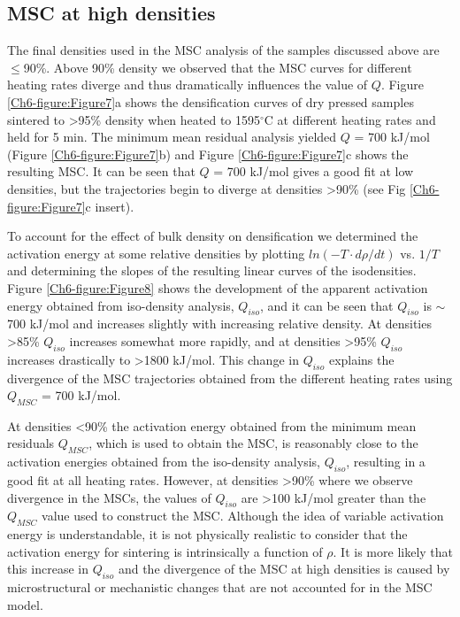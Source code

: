 \subsection{MSC at high densities}
The final densities used in the MSC analysis of the samples discussed above are $\leq$90\%. Above 90\% density we observed that the MSC curves for different heating rates diverge and thus dramatically influences the value of $Q$. Figure \ref{Ch6-figure:Figure7}a shows the densification curves of dry pressed samples sintered to >95\% density when heated to 1595$^{\circ}$C at different heating rates and held for 5 min. The minimum mean residual analysis yielded $Q$ = 700 kJ/mol (Figure \ref{Ch6-figure:Figure7}b) and Figure \ref{Ch6-figure:Figure7}c shows the resulting MSC. It can be seen that $Q$ = 700 kJ/mol gives a good fit at low densities, but the trajectories begin to diverge at densities >90\% (see Fig \ref{Ch6-figure:Figure7}c insert). 

To account for the effect of bulk density on densification we determined the activation energy at some relative densities by plotting $ln(-T \cdot d\rho/dt)$ vs. $1/T$ and determining the slopes of the resulting linear curves of the isodensities. Figure \ref{Ch6-figure:Figure8} shows the development of the apparent activation energy obtained from iso-density analysis, $Q_{iso}$, and it can be seen that $Q_{iso}$ is $\sim$700 kJ/mol and increases slightly with increasing relative density. At densities >85\% $Q_{iso}$ increases somewhat more rapidly, and at densities >95\% $Q_{iso}$ increases drastically to >1800 kJ/mol. This change in $Q_{iso}$ explains the divergence of the MSC trajectories obtained from the different heating rates using $Q_{MSC}$ = 700 kJ/mol. 

At densities <90\% the activation energy obtained from the minimum mean residuals $Q_{MSC}$, which is used to obtain the MSC, is reasonably close to the activation energies obtained from the iso-density analysis, $Q_{iso}$, resulting in a good fit at all heating rates. However, at densities >90\% where we observe divergence in the MSCs, the values of $Q_{iso}$ are >100 kJ/mol greater than the $Q_{MSC}$ value used to construct the MSC. Although the idea of variable activation energy is understandable, it is not physically realistic to consider that the activation energy for sintering is intrinsically a function of $\rho$. It is more likely that this increase in $Q_{iso}$ and the divergence of the MSC at high densities is caused by microstructural or mechanistic changes that are not accounted for in the MSC model. 

